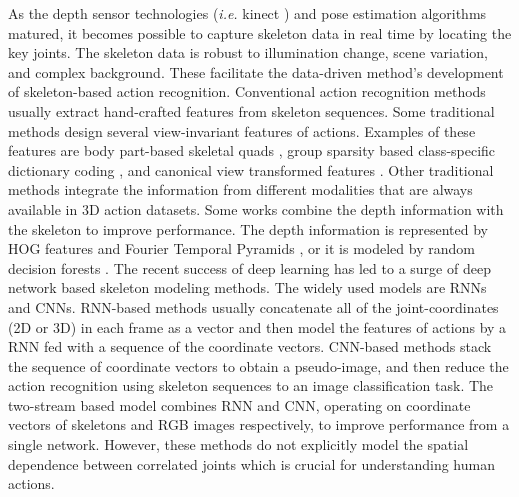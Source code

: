 \documentclass[runningheads]{llncs}
\begin{document}
As the depth sensor technologies (\textit{i.e.} kinect \cite{zhang2012microsoft}) and pose estimation algorithms \cite{toshev2014deeppose,cao2017realtime} matured, it becomes possible to capture skeleton data in real time by locating the key joints. The skeleton data is robust to illumination change, scene variation, and complex background. These facilitate the data-driven method's development of skeleton-based action recognition.
Conventional action recognition methods usually extract hand-crafted features from skeleton sequences. Some traditional methods \cite{evangelidis2014skeletal,vemulapalli2014human,luo2013group,rahmani2015learning} design several view-invariant features of actions. Examples of these features are body part-based skeletal quads \cite{evangelidis2014skeletal,vemulapalli2014human}, group sparsity based class-specific dictionary coding \cite{luo2013group}, and canonical view transformed features \cite{rahmani2015learning}. Other traditional methods integrate the information from different modalities that are always available in 3D action datasets. Some works \cite{hu2015jointly,ohn2013joint,rahmani2014real,wang2013learning} combine the depth information with the skeleton to improve performance. The depth information is represented by HOG features \cite{hu2015jointly,ohn2013joint} and Fourier Temporal Pyramids \cite{wang2013learning}, or it is modeled by random decision forests \cite{rahmani2014real}.
The recent success of deep learning has led to a surge of deep network based skeleton modeling methods. The widely used models are RNNs and CNNs. RNN-based methods \cite{du2015hierarchical,song2017end,zhang2017view,li2018independently} usually concatenate all of the joint-coordinates (2D or 3D) in each frame as a vector and then model the features of actions by a RNN fed with a sequence of the coordinate vectors. CNN-based methods \cite{ke2017new,liu2017enhanced,liu2017two} stack the sequence of coordinate vectors to obtain a pseudo-image, and then reduce the action recognition using skeleton sequences to an image classification task. The two-stream based model \cite{zhao2017two} combines RNN and CNN, operating on coordinate vectors of skeletons and RGB images respectively, to improve performance from a single network. However, these methods do not explicitly model the spatial dependence between correlated joints which is crucial for understanding human actions.

\vspace{-1mm}
\end{document}
